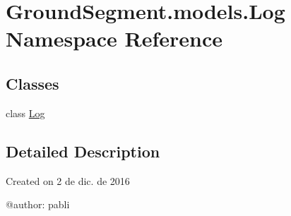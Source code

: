 \hypertarget{namespace_ground_segment_1_1models_1_1_log}{}\section{Ground\+Segment.\+models.\+Log Namespace Reference}
\label{namespace_ground_segment_1_1models_1_1_log}
\subsection*{Classes}
\begin{DoxyCompactItemize}
\item 
class \hyperlink{class_ground_segment_1_1models_1_1_log_1_1_log}{Log}
\end{DoxyCompactItemize}


\subsection{Detailed Description}
\begin{DoxyVerb}Created on 2 de dic. de 2016

@author: pabli
\end{DoxyVerb}
 